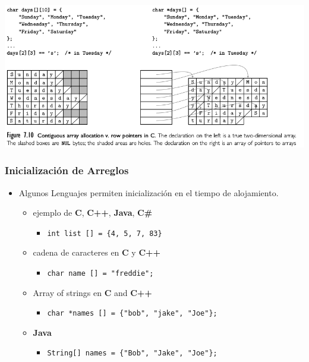 \documentclass[11pt]{article}
\begin{document}
\includegraphics[width=.9\linewidth]{arraypontrowc.png}

\subsubsection*{Inicialización de Arreglos}
\label{sec:orgheadline23}
\begin{itemize}
\item Algunos Lenguajes permiten inicialización en el tiempo de
alojamiento.
\begin{itemize}
\item ejemplo de \textbf{C}, \textbf{C++}, \textbf{Java}, \textbf{C\#}
\begin{itemize}
\item \texttt{int list [] = \{4, 5, 7, 83\}}
\end{itemize}
\item cadena de caracteres en \textbf{C} y \textbf{C++}
\begin{itemize}
\item \texttt{char name [] = "freddie";}
\end{itemize}
\item Array of strings en \textbf{C} and \textbf{C++}
\begin{itemize}
\item \texttt{char *names [] = \{"bob", "jake", "Joe"\};}
\end{itemize}
\item \textbf{Java} 
\begin{itemize}
\item \texttt{String[] names = \{"Bob", "Jake", "Joe"\};}
\end{itemize}
\end{itemize}
\end{itemize}
\end{document}

